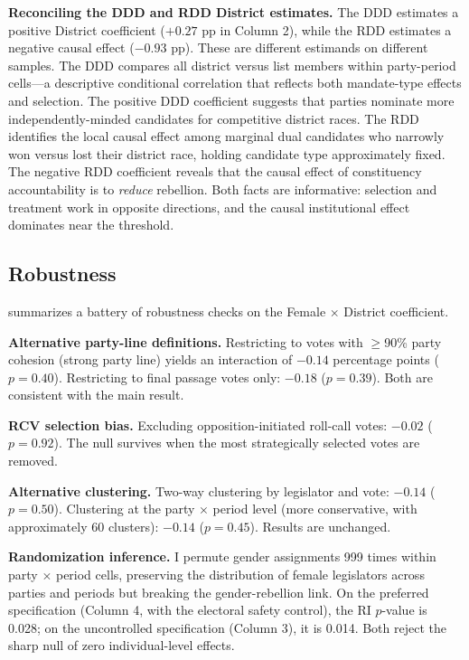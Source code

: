 \documentclass[12pt]{article}
\begin{document}
\textbf{Reconciling the DDD and RDD District estimates.} The DDD estimates a positive District coefficient ($+0.27$ pp in Column 2), while the RDD estimates a negative causal effect ($-0.93$ pp). These are different estimands on different samples. The DDD compares all district versus list members within party-period cells---a descriptive conditional correlation that reflects both mandate-type effects and selection. The positive DDD coefficient suggests that parties nominate more independently-minded candidates for competitive district races. The RDD identifies the local causal effect among marginal dual candidates who narrowly won versus lost their district race, holding candidate type approximately fixed. The negative RDD coefficient reveals that the causal effect of constituency accountability is to \textit{reduce} rebellion. Both facts are informative: selection and treatment work in opposite directions, and the causal institutional effect dominates near the threshold.

\subsection{Robustness}

 summarizes a battery of robustness checks on the Female $\times$ District coefficient.



\textbf{Alternative party-line definitions.} Restricting to votes with $\geq$90\% party cohesion (strong party line) yields an interaction of $-0.14$ percentage points ($p = 0.40$). Restricting to final passage votes only: $-0.18$ ($p = 0.39$). Both are consistent with the main result.

\textbf{RCV selection bias.} Excluding opposition-initiated roll-call votes: $-0.02$ ($p = 0.92$). The null survives when the most strategically selected votes are removed.

\textbf{Alternative clustering.} Two-way clustering by legislator and vote: $-0.14$ ($p = 0.50$). Clustering at the party $\times$ period level (more conservative, with approximately 60 clusters): $-0.14$ ($p = 0.45$). Results are unchanged.

\textbf{Randomization inference.} I permute gender assignments 999 times within party $\times$ period cells, preserving the distribution of female legislators across parties and periods but breaking the gender-rebellion link. On the preferred specification (Column 4, with the electoral safety control), the RI $p$-value is 0.028; on the uncontrolled specification (Column 3), it is 0.014. Both reject the sharp null of zero individual-level effects.
\end{document}
